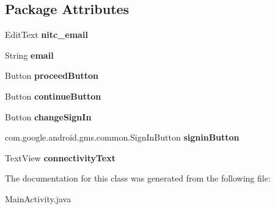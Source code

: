 \subsection*{\-Package \-Attributes}
\begin{DoxyCompactItemize}
\item 
\hypertarget{classcom_1_1example_1_1sel_1_1lostfound_1_1MainActivity_a843c6ee9fc0bc02ee0b1753e4bf859f2}{\-Edit\-Text {\bfseries nitc\-\_\-email}}\label{classcom_1_1example_1_1sel_1_1lostfound_1_1MainActivity_a843c6ee9fc0bc02ee0b1753e4bf859f2}

\item 
\hypertarget{classcom_1_1example_1_1sel_1_1lostfound_1_1MainActivity_acb19b0fa70d333a4bbca7f8ab31dd317}{\-String {\bfseries email}}\label{classcom_1_1example_1_1sel_1_1lostfound_1_1MainActivity_acb19b0fa70d333a4bbca7f8ab31dd317}

\item 
\hypertarget{classcom_1_1example_1_1sel_1_1lostfound_1_1MainActivity_aa7cc7873f4067112fad5599f83403524}{\-Button {\bfseries proceed\-Button}}\label{classcom_1_1example_1_1sel_1_1lostfound_1_1MainActivity_aa7cc7873f4067112fad5599f83403524}

\item 
\hypertarget{classcom_1_1example_1_1sel_1_1lostfound_1_1MainActivity_a7d8f8d8d0af4713f9073f1ddd864432f}{\-Button {\bfseries continue\-Button}}\label{classcom_1_1example_1_1sel_1_1lostfound_1_1MainActivity_a7d8f8d8d0af4713f9073f1ddd864432f}

\item 
\hypertarget{classcom_1_1example_1_1sel_1_1lostfound_1_1MainActivity_aedc7611c37618a32ac7ca15c4dd5e801}{\-Button {\bfseries change\-Sign\-In}}\label{classcom_1_1example_1_1sel_1_1lostfound_1_1MainActivity_aedc7611c37618a32ac7ca15c4dd5e801}

\item 
\hypertarget{classcom_1_1example_1_1sel_1_1lostfound_1_1MainActivity_a1010b21b2c15f8fc653cd2e11e66c3c3}{com.\-google.\-android.\-gms.\-common.\-Sign\-In\-Button {\bfseries signin\-Button}}\label{classcom_1_1example_1_1sel_1_1lostfound_1_1MainActivity_a1010b21b2c15f8fc653cd2e11e66c3c3}

\item 
\hypertarget{classcom_1_1example_1_1sel_1_1lostfound_1_1MainActivity_ad34449b278aebf6f163c9e637d9da143}{\-Text\-View {\bfseries connectivity\-Text}}\label{classcom_1_1example_1_1sel_1_1lostfound_1_1MainActivity_ad34449b278aebf6f163c9e637d9da143}

\end{DoxyCompactItemize}


\-The documentation for this class was generated from the following file\-:\begin{DoxyCompactItemize}
\item 
\-Main\-Activity.\-java\end{DoxyCompactItemize}
